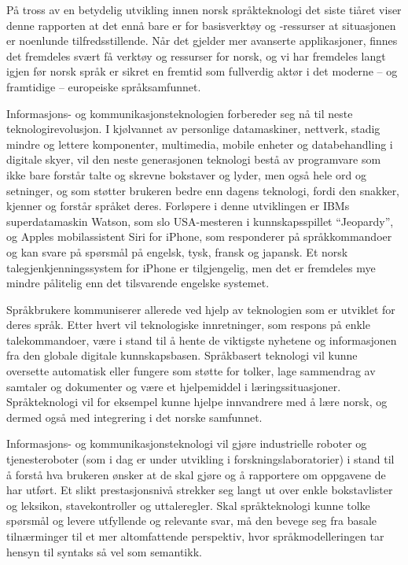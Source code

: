 \begin{multicols}{2}
På tross av en betydelig utvikling innen norsk språkteknologi det siste tiåret viser denne rapporten at det ennå bare er for basisverktøy og -ressurser at situasjonen er noenlunde tilfredsstillende. Når det gjelder mer avanserte applikasjoner, finnes det fremdeles svært få verktøy og ressurser for norsk, og vi har fremdeles langt igjen før norsk språk er sikret en fremtid som fullverdig aktør i det moderne -- og framtidige -- europeiske språksamfunnet.   

Informasjons- og kommunikasjonsteknologien forbereder seg nå til neste teknologirevolusjon. I kjølvannet av personlige datamaskiner, nettverk, stadig mindre og lettere komponenter, multimedia, mobile enheter og databehandling i digitale skyer, vil den neste generasjonen teknologi bestå av programvare som ikke bare forstår talte og skrevne bokstaver og lyder, men også hele ord og setninger, og som støtter brukeren bedre enn dagens teknologi, fordi den snakker, kjenner og forstår språket deres. Forløpere i denne utviklingen er IBMs superdatamaskin Watson, som slo USA-mesteren i kunnskapsspillet “Jeopardy”, og Apples mobilassistent Siri for iPhone, som responderer på språkkommandoer og kan svare på spørsmål på engelsk, tysk, fransk og japansk. Et norsk talegjenkjenningssystem for iPhone er tilgjengelig, men det er fremdeles mye mindre pålitelig enn det tilsvarende engelske systemet. 

Språkbrukere kommuniserer allerede ved hjelp av teknologien som er utviklet for deres språk. Etter hvert vil teknologiske innretninger, som respons på enkle talekommandoer, være i stand til å hente de viktigste nyhetene og informasjonen fra den globale digitale kunnskapsbasen. Språkbasert teknologi vil kunne oversette automatisk eller fungere som støtte for tolker, lage sammendrag av samtaler og dokumenter og være et hjelpemiddel i læringssituasjoner. Språkteknologi vil for eksempel kunne hjelpe innvandrere med å lære norsk, og dermed også med integrering i det norske samfunnet.        
 
Informasjons- og kommunikasjonsteknologi vil gjøre industrielle
roboter og tjenesteroboter (som i dag er under utvikling i
forskningslaboratorier) i stand til å forstå hva brukeren ønsker at de
skal gjøre og å rapportere om oppgavene de har utført. Et slikt
prestasjonsnivå strekker seg langt ut over enkle bokstavlister og
leksikon, stavekontroller og uttaleregler. Skal språkteknologi kunne
tolke spørsmål og levere utfyllende og relevante svar, må den bevege
seg fra basale tilnærminger til et mer altomfattende perspektiv, hvor
språkmodelleringen tar hensyn til syntaks så vel som semantikk.  
\columnbreak


\end{multicols}
